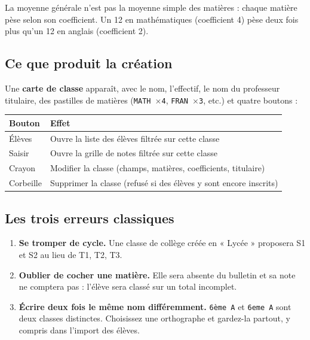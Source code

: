\documentclass[11pt,a4paper]{article}
\begin{document}
\begin{boiteastuce}
La moyenne générale n'est pas la moyenne simple des matières : chaque matière
pèse selon son coefficient. Un 12 en mathématiques (coefficient 4) pèse deux fois
plus qu'un 12 en anglais (coefficient 2).
\end{boiteastuce}

\subsection{Ce que produit la création}

Une \textbf{carte de classe} apparaît, avec le nom, l'effectif, le nom du
professeur titulaire, des pastilles de matières (\texttt{MATH $\times$4},
\texttt{FRAN $\times$3}, etc.) et quatre boutons :

\begin{center}
\renewcommand{\arraystretch}{1.25}
\begin{tabularx}{\textwidth}{@{} >{\raggedright}p{2.3cm} X@{}}
\toprule
\textbf{Bouton} & \textbf{Effet} \\
\midrule
Élèves & Ouvre la liste des élèves filtrée sur cette classe \\
Saisir & Ouvre la grille de notes filtrée sur cette classe \\
Crayon & Modifier la classe (champs, matières, coefficients, titulaire) \\
Corbeille & Supprimer la classe (refusé si des élèves y sont encore inscrits) \\
\bottomrule
\end{tabularx}
\end{center}

\subsection{Les trois erreurs classiques}

\begin{boiteerreur}
\begin{enumerate}
  \item \textbf{Se tromper de cycle.} Une classe de collège créée en « Lycée »
        proposera S1 et S2 au lieu de T1, T2, T3.
  \item \textbf{Oublier de cocher une matière.} Elle sera absente du bulletin et
        sa note ne comptera pas : l'élève sera classé sur un total incomplet.
  \item \textbf{Écrire deux fois le même nom différemment.} \texttt{6ème A} et
        \texttt{6eme A} sont deux classes distinctes. Choisissez une orthographe
        et gardez-la partout, y compris dans l'import des élèves.
\end{enumerate}
\end{boiteerreur}
\end{document}
